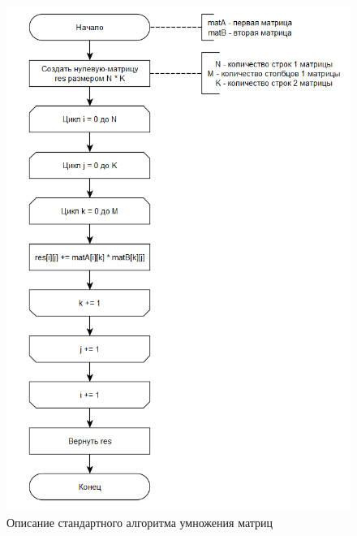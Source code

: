 \documentclass{article}
\begin{document}
\begin{figure}[h]
	\centering
	\includegraphics[scale=0.6]{tools/alg_1.png}
	\caption{Описание стандартного алгоритма умножения матриц}
	\label{fig:standard}
\end{figure}
\end{document}
